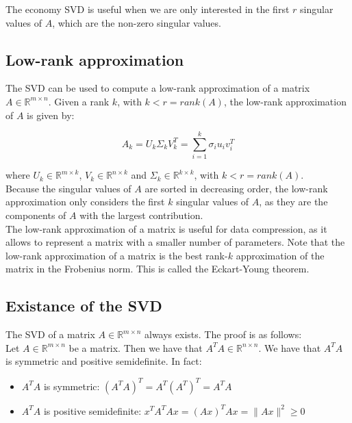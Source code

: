 The economy SVD is useful when we are only interested in the first $r$ singular values of $A$, which are the non-zero singular values.\\

\subsection{Low-rank approximation}

The SVD can be used to compute a low-rank approximation of a matrix $A \in \mathbb{R}^{m \times n}$. Given a rank $k$, with $k < r = rank(A)$,
the low-rank approximation of $A$ is given by:

\begin{equation}
    A_k = U_k \Sigma_k V_k^T = \sum_{i=1}^{k} \sigma_i u_i v_i^T
\end{equation}

where $U_k \in \mathbb{R}^{m \times k}$, $V_k \in \mathbb{R}^{n \times k}$ and $\Sigma_k \in \mathbb{R}^{k \times k}$, with $k < r = rank(A)$.\\

Because the singular values of $A$ are sorted in decreasing order, the low-rank approximation only considers the first $k$ singular values of $A$,
as they are the components of $A$ with the largest contribution.\\

The low-rank approximation of a matrix is useful for data compression, as it allows to represent a matrix with a smaller number of parameters. 
Note that the low-rank approximation of a matrix is the best rank-$k$ approximation of the matrix in the Frobenius norm. This is called 
the Eckart-Young theorem.

\subsection{Existance of the SVD}

The SVD of a matrix $A \in \mathbb{R}^{m \times n}$ always exists. The proof is as follows:\\

Let $A \in \mathbb{R}^{m \times n}$ be a matrix. Then we have that $A^T A \in \mathbb{R}^{n \times n}$.
We have that $A^T A$ is symmetric and positive semidefinite. In fact:

\begin{itemize}
    \item $A^T A$ is symmetric: $(A^T A)^T = A^T (A^T)^T = A^T A$
    \item $A^T A$ is positive semidefinite: $x^T A^T A x = (A x)^T A x = \|A x\|^2 \geq 0$
\end{itemize}

